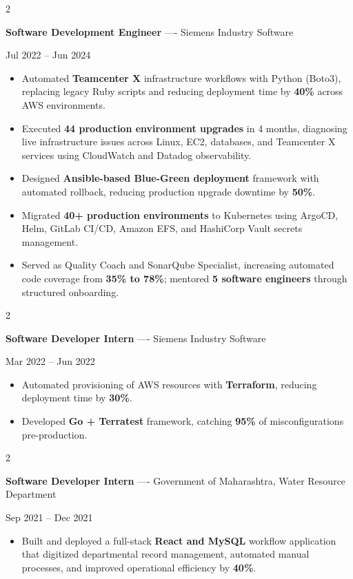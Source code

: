 \documentclass[10pt, letterpaper]{article}
\newenvironment{highlights}{
    \begin{itemize}[
        topsep=0.10 cm,
        parsep=0.06 cm,
        partopsep=0pt,
        itemsep=0.06 cm,
        leftmargin=12pt
    ]
}{
    \end{itemize}
}
\newenvironment{twocolentry}[2][]{
    \onecolentry
    \def\secondColumn{#2}
    \setcolumnwidth{\fill, 4.5 cm}
    \begin{paracol}{2}
}{
    \switchcolumn \raggedleft \secondColumn
    \end{paracol}
    \endonecolentry
}
\begin{document}
\vspace{0.15 cm}

\begin{twocolentry}{Jul 2022 -- Jun 2024}
\textbf{Software Development Engineer} ---- Siemens Industry Software
\end{twocolentry}
\begin{highlights}
  \item Automated \textbf{Teamcenter X} infrastructure workflows with Python (Boto3), replacing legacy Ruby scripts and reducing deployment time by \textbf{40\%} across AWS environments.
  \item Executed \textbf{44 production environment upgrades} in 4 months, diagnosing live infrastructure issues across Linux, EC2, databases, and Teamcenter X services using CloudWatch and Datadog observability.
  \item Designed \textbf{Ansible-based Blue-Green deployment} framework with automated rollback, reducing production upgrade downtime by \textbf{50\%}.
  \item Migrated \textbf{40+ production environments} to Kubernetes using ArgoCD, Helm, GitLab CI/CD, Amazon EFS, and HashiCorp Vault secrets management.
  \item Served as Quality Coach and SonarQube Specialist, increasing automated code coverage from \textbf{35\% to 78\%}; mentored \textbf{5 software engineers} through structured onboarding.
\end{highlights}

\vspace{0.15 cm}

\begin{twocolentry}{Mar 2022 -- Jun 2022}
\textbf{Software Developer Intern} ---- Siemens Industry Software
\end{twocolentry}
\begin{highlights}
  \item Automated provisioning of AWS resources with \textbf{Terraform}, reducing deployment time by \textbf{30\%}.
  \item Developed \textbf{Go + Terratest} framework, catching \textbf{95\%} of misconfigurations pre-production.
\end{highlights}

\vspace{0.15 cm}

\begin{twocolentry}{Sep 2021 -- Dec 2021}
\textbf{Software Developer Intern} ---- Government of Maharashtra, Water Resource Department
\end{twocolentry}
\begin{highlights}
  \item Built and deployed a full-stack \textbf{React and MySQL} workflow application that digitized departmental record management, automated manual processes, and improved operational efficiency by \textbf{40\%}.
\end{highlights}
\end{document}
